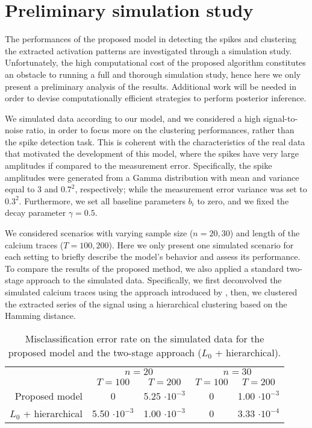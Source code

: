 \section{Preliminary simulation study}
The performances of the proposed model in detecting the spikes and clustering the extracted activation patterns are investigated through a simulation study. Unfortunately, the high computational cost of the proposed algorithm constitutes an obstacle to running a full and thorough simulation study, hence here we only present a preliminary analysis of the results. Additional work will be needed in order to devise computationally efficient strategies to perform posterior inference.

We simulated data according to our model, and we considered a high signal-to-noise ratio, in order to focus more on the clustering performances, rather than the spike detection task. This is coherent with the characteristics of the real data that motivated the development of this model, where the spikes have very large amplitudes if compared to the measurement error. Specifically, the spike amplitudes were generated from a Gamma distribution with mean and variance equal to 3 and $0.7^2$, respectively; while the measurement error variance was set to $0.3^2$. Furthermore, we set all baseline parameters $b_i$ to zero, and we fixed the decay parameter $\gamma=0.5$.

We considered scenarios with varying sample size ($n = 20, 30$) and length of the calcium traces ($T = 100, 200$). Here we only present one simulated scenario for each setting to briefly describe the model's behavior and assess its performance. To compare the results of the proposed method, we also applied a standard two-stage approach to the simulated data. Specifically, we first deconvolved the simulated calcium traces using the approach introduced by \textcite{jewell2019}, then, we clustered the extracted series of the signal using a hierarchical clustering based on the Hamming distance.

\begin{table}
	\centering
	\begin{tabular}{r||cc|cc}
		& \multicolumn{2}{c}{$n=20$}	    & \multicolumn{2}{c}{$n=30$} \\
		&  $T=100$ 		  & $T=200$ 		& $T=100$ 		  & $T=200$ \\
		\hline
		Proposed model  		&		0		  	    &   5.25 $\cdot 10^{-3}$			&  0							  & 1.00 $\cdot 10^{-3}$		\\
		$L_0$ + hierarchical    & 5.50 $\cdot 10^{-3}$	&   1.00 $\cdot 10^{-3}$			&  0							  & 3.33 $\cdot 10^{-4}$				
	\end{tabular}
	\label{ch4:tab_misclass}
	\caption[Misclassification error rate on the simulated data.]{Misclassification error rate on the simulated data for the proposed model and the two-stage approach ($L_0$ + hierarchical). }
\end{table}

